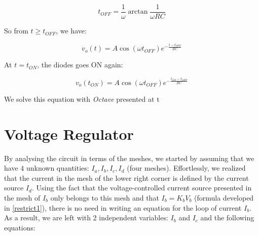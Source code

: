 \begin{equation}
  t_{OFF} = \frac{1}{\omega}\arctan\frac{1}{\omega RC}
\end{equation}

So from $t \geq t_{OFF}$, we have:

\begin{equation}
  v_o(t) = A\cos(\omega t_{OFF}) e^{-\frac{t-t_{OFF}}{RC}}
\end{equation}

At $t = t_{ON}$, the diodes goes ON again:

\begin{equation}
  v_o(t_{ON}) = A\cos(\omega t_{OFF}) e^{-\frac{t_{ON}-t_{OFF}}{RC}}
\end{equation}

We solve this equation with \textit{Octave} presented at t


\section{Voltage Regulator}

By analysing the circuit in terms of the meshes, we started by assuming that we have $4$ unknown quantities: $I_a, I_b, I_c, I_d$ (four meshes).
Effortlessly, we realized that the current in the mesh of the lower right corner is defined by the current source $I_d$.
Using the fact that the voltage-controlled current source presented in the mesh of $I_b$ only belongs to this mesh and that $I_b = K_b V_b$ (formula developed in \ref{restrict1}), there is no need in writing an equation for the loop of current $I_b$.
As a result, we are left with 2 independent variables: $I_b$ and $I_c$ and the following equations:





